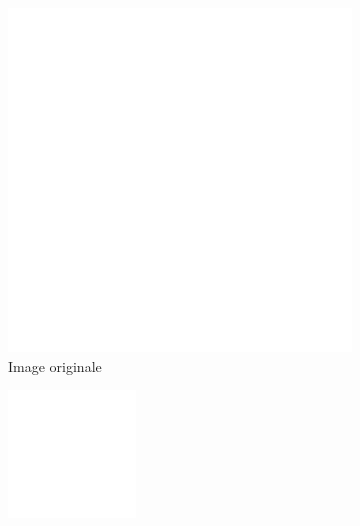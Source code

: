 \begin{figure}[h]
    \centering

    \begin{subfigure}{.3\textwidth}
        \centering
        \includegraphics[width=\textwidth]{contenu/resources/images/gauss_0}
        \caption{Image originale}
    \end{subfigure}
    \hfill
    \begin{subfigure}{.3\textwidth}
        \centering
        \includegraphics[width=\textwidth]{contenu/resources/images/gauss_3}

\end{subfigure}
\end{figure}
